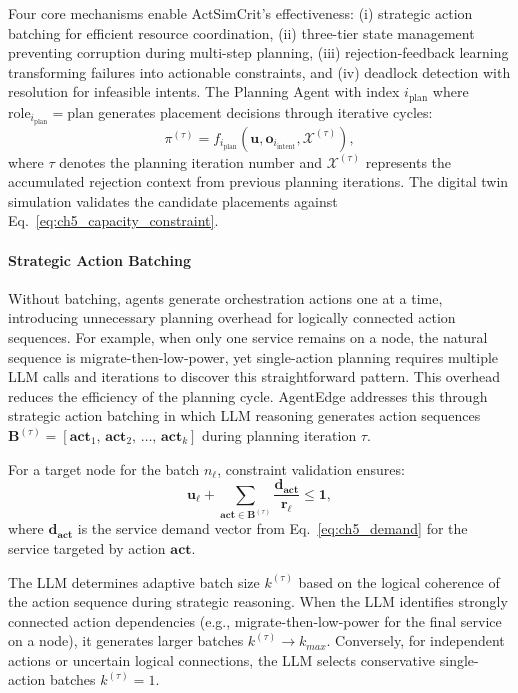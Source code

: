 Four core mechanisms enable \ac{ActSimCrit}'s effectiveness: (i) strategic action batching for efficient resource coordination, (ii) three-tier state management preventing corruption during multi-step planning, (iii) rejection-feedback learning transforming failures into actionable constraints, and (iv) deadlock detection with resolution for infeasible intents. The Planning Agent with index $i_{\text{plan}}$ where $\text{role}_{i_{\text{plan}}} = \text{plan}$ generates placement decisions through iterative cycles:
\begin{equation}
\pi^{(\tau)} = f_{i_{\text{plan}}}(\mathbf{u}, \mathbf{o}_{i_{\text{intent}}}, \mathcal{X}^{(\tau)}),
\label{eq:ch5_enhanced_plan_agent}
\end{equation}
where $\tau$ denotes the planning iteration number and $\mathcal{X}^{(\tau)}$ represents the accumulated rejection context from previous planning iterations. The digital twin simulation validates the candidate placements against Eq.~\ref{eq:ch5_capacity_constraint}.


\paragraph{Strategic Action Batching}

Without batching, agents generate orchestration actions one at a time, introducing unnecessary planning overhead for logically connected action sequences. For example, when only one service remains on a node, the natural sequence is migrate-then-low-power, yet single-action planning requires multiple \ac{LLM} calls and iterations to discover this straightforward pattern. This overhead reduces the efficiency of the planning cycle. \ac{AgentEdge} addresses this through strategic action batching in which \ac{LLM} reasoning generates action sequences $\mathbf{B}^{(\tau)} = [\mathbf{act}_1,\, \mathbf{act}_2,\, \ldots,\, \mathbf{act}_k]$ during planning iteration $\tau$. 

For a target node for the batch $n_\ell$, constraint validation ensures:
\begin{equation}
\mathbf{u}_\ell + \sum_{\mathbf{act} \in \mathbf{B}^{(\tau)}} \frac{\mathbf{d}_{\mathbf{act}}}{\mathbf{r}_\ell} \leq \mathbf{1},
\label{eq:ch5_batch_constraint}
\end{equation}
where $\mathbf{d}_{\mathbf{act}}$ is the service demand vector from Eq.~\ref{eq:ch5_demand} for the service targeted by action $\mathbf{act}$.

The \ac{LLM} determines adaptive batch size $k^{(\tau)}$ based on the logical coherence of the action sequence during strategic reasoning. When the \ac{LLM} identifies strongly connected action dependencies (e.g., migrate-then-low-power for the final service on a node), it generates larger batches $k^{(\tau)} \to k_{max}$. Conversely, for independent actions or uncertain logical connections, the \ac{LLM} selects conservative single-action batches $k^{(\tau)} = 1$.

